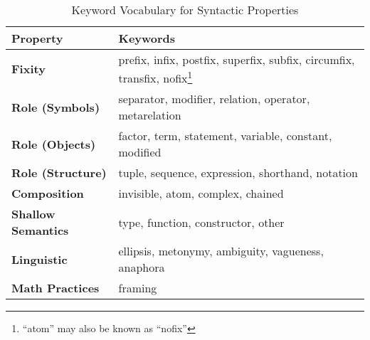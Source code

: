 \begin{table}
\begin{center}
\begin{tabular}{|l|l|} 
\hline \textbf{Property} & \textbf{Keywords} \\ \hline
\textbf{Fixity} & prefix, infix, postfix, superfix, subfix, circumfix, transfix, nofix\footnote{``atom'' may also be known as ``nofix''} \\[1mm]
\textbf{Role (Symbols)} & separator, modifier, relation,  operator, metarelation \\[1mm]
\textbf{Role (Objects)} & factor, term, statement, variable, constant, modified \\[1mm]
\textbf{Role (Structure)} & tuple, sequence, expression, shorthand, notation \\[1mm]
\textbf{Composition} & invisible, atom, complex, chained\\[1mm]
\textbf{Shallow Semantics} & type, function, constructor, other \\[1mm]
\textbf{Linguistic} & ellipsis, metonymy, ambiguity, vagueness, anaphora\\[1mm]
\textbf{Math Practices} & framing\\[1mm]
\hline
\end{tabular}
\caption{Keyword Vocabulary for Syntactic Properties}
\end{center}
\end{table}